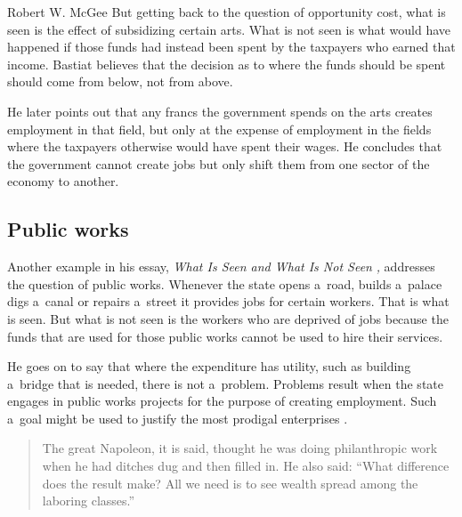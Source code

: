 \begin{artengenv}{Robert W. McGee}
But getting back to the question of opportunity cost, what is seen is the effect of subsidizing certain arts. What is not seen is what would have happened if those funds had instead been spent by the taxpayers who earned that income. Bastiat believes that the decision as to where the funds should be spent should come from below, not from above.



He later points out that any francs the government spends on the arts creates employment in that field, but only at the expense of employment in the fields where the taxpayers otherwise would have spent their wages. He concludes that the government cannot create jobs but only shift them from one sector of the economy to another.



\subsection{Public works}



Another example in his essay, \textit{What Is Seen and What Is Not Seen} 
\parencite[][]{bastiat_selected_1964}%
\textit{,} addresses the question of public works. Whenever the state opens a~road, builds a~palace digs a~canal or repairs a~street it provides jobs for certain workers. That is what is seen. But what is not seen is the workers who are deprived of jobs because the funds that are used for those public works cannot be used to hire their services.



He goes on to say that where the expenditure has utility, such as building a~bridge that is needed, there is not a~problem. Problems result when the state engages in public works projects for the purpose of creating employment. Such a~goal might be used to justify the most prodigal enterprises 
\parencite[][p.17]{bastiat_selected_1964}.%




\begin{quote}
The great Napoleon, it is said, thought he was doing philanthropic work when he had ditches dug and then filled in. He also said: ``What difference does the result make? All we need is to see wealth spread among the laboring classes.'' 
\parencite[][p.18]{bastiat_selected_1964}%
\end{quote}





\end{artengenv}
